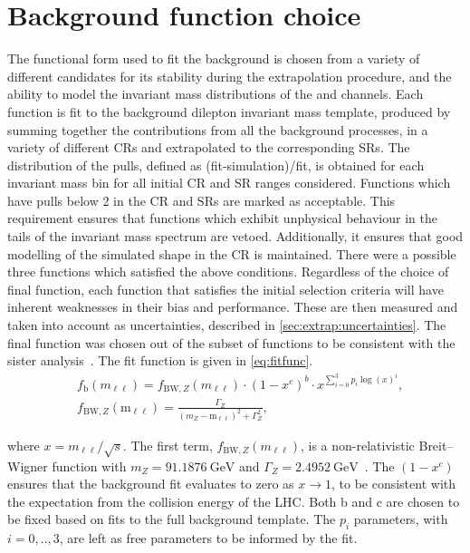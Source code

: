 \section{Background function choice}\label{sec:modelchoice}
The functional form used to fit the background is chosen from a variety of different candidates for its stability during the extrapolation procedure, and the ability to model the invariant mass distributions of the \ee and \mumu channels. Each function is fit to the background dilepton invariant mass template, produced by summing together the contributions from all the background processes, in a variety of different CRs and extrapolated to the corresponding SRs. The distribution of the pulls, defined as (fit-simulation)/fit, is obtained for each invariant mass bin for all initial CR and SR ranges considered. Functions which have pulls below 2 in the CR and SRs are marked as acceptable. This requirement ensures that functions which exhibit unphysical behaviour in the tails of the invariant mass spectrum are vetoed. Additionally, it ensures that good modelling of the simulated shape in the CR is maintained. There were a possible three functions which satisfied the above conditions. Regardless of the choice of final function, each function that satisfies the initial selection criteria will have inherent weaknesses in their bias and performance. These are then measured and taken into account as uncertainties, described in \cref{sec:extrap:uncertainties}. The final function was chosen out of the subset of functions to be consistent with the sister analysis~\cite{Aad:2019fac}. The fit function is given in \cref{eq:fitfunc}. 
\begin{equation}
    \label{eq:fitfunc}
    \begin{aligned}
        & f_\textrm{b}(m_{\ell\ell}) = f_{\mathrm{BW},Z}(m_{\ell\ell}) \cdot \left(1 - x^{c}\right)^{b} \cdot x^{\sum_{i=0}^3 p_i\log(x)^i}, \\
        & f_{\mathrm{BW},Z}(\mathrm{m_{\ell\ell}}) = \frac{\Gamma_Z}{(m_Z - \mathrm{m_{\ell\ell}})^2 + \Gamma_Z^2},
    \end{aligned}
\end{equation}

where $x = m_{\ell\ell}/\sqrt{s}$. The first term, $f_{\mathrm{BW},Z}(m_{\ell\ell})$, is a non-relativistic Breit--Wigner function with $m_Z = \SI{91.1876}{\giga\electronvolt}$ and $\Gamma_Z = \SI{2.4952}{\giga\electronvolt}$~\cite{PhysRevD.98.030001}. The $(1 - x^{c})$ ensures that the background fit evaluates to zero as $x \to 1$, to be consistent with the expectation from the collision energy of the LHC. Both b and c are chosen to be fixed based on fits to the full background template. The $p_i$ parameters, with $i = 0,..,3$, are left as free parameters to be informed by the fit. 

